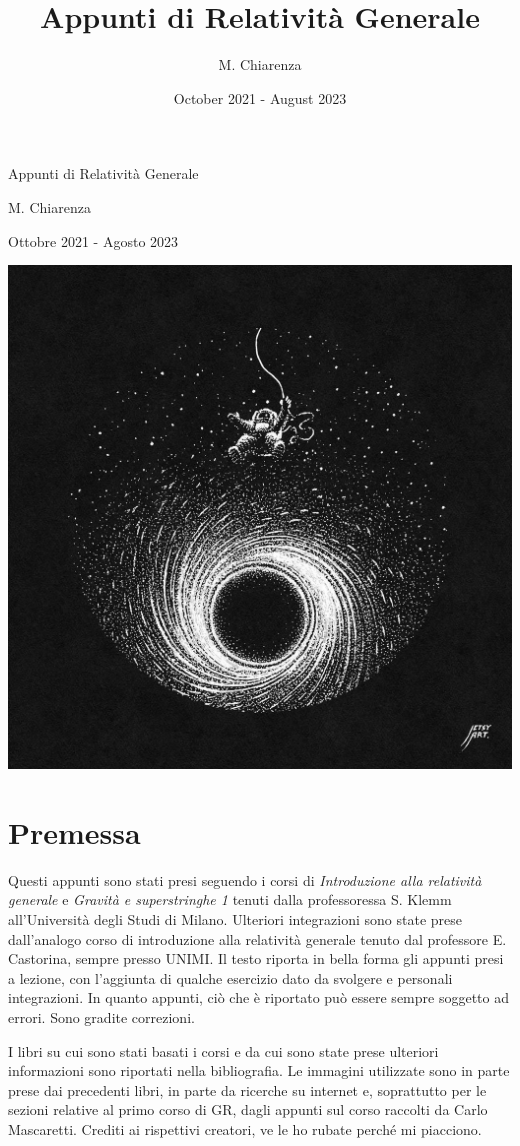 \documentclass[twoside]{report}
\title{Appunti di Relatività Generale}
\author{M. Chiarenza }
\date{October 2021 - August 2023}
\theoremstyle{definition}
\theoremstyle{plain}
\theoremstyle{plain}
\begin{document}
\begin{titlepage}
    \centering
    \null
    \vspace{4 cm}
    \Huge Appunti di Relatività Generale
    
    \vspace{1 cm}
    \Large M. Chiarenza

    Ottobre 2021 - Agosto 2023
    \vspace{3 cm}
   
    \includegraphics[width=0.8\linewidth]{immagini/blackhole_sketch.jpg}
\end{titlepage}

\tableofcontents
\newpage
\pagestyle{headings}
\section*{Premessa}
Questi appunti sono stati presi seguendo i corsi di  \textit{Introduzione alla relatività generale} e \textit{Gravità e superstringhe 1} tenuti dalla professoressa S. Klemm all'Università degli Studi di Milano.  Ulteriori integrazioni sono state prese dall'analogo corso di introduzione alla relatività generale tenuto dal professore E. Castorina, sempre presso UNIMI. Il testo riporta in bella forma gli appunti presi a lezione, con l'aggiunta di qualche esercizio dato da svolgere e personali integrazioni. In quanto appunti, ciò che è riportato può essere sempre soggetto ad errori. Sono gradite correzioni.

I libri su cui sono stati basati i corsi e da cui sono state prese ulteriori informazioni sono riportati nella bibliografia. Le immagini utilizzate sono in parte prese dai precedenti libri, in parte da ricerche su internet e, soprattutto per le sezioni relative al primo corso di GR, dagli appunti sul corso raccolti da Carlo Mascaretti. Crediti ai rispettivi creatori, ve le ho rubate perché mi piacciono.
\end{document}

